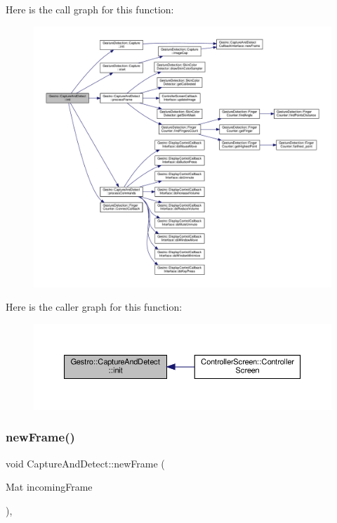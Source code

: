 Here is the call graph for this function\+:
\nopagebreak
\begin{figure}[H]
\begin{center}
\leavevmode
\includegraphics[width=350pt]{class_gestro_1_1_capture_and_detect_a1df110dc696cebc95eb5d7ead2d74447_cgraph}
\end{center}
\end{figure}
Here is the caller graph for this function\+:
\nopagebreak
\begin{figure}[H]
\begin{center}
\leavevmode
\includegraphics[width=350pt]{class_gestro_1_1_capture_and_detect_a1df110dc696cebc95eb5d7ead2d74447_icgraph}
\end{center}
\end{figure}
\mbox{\label{class_gestro_1_1_capture_and_detect_a7f18d1c58b2ae4241766b36aa27385e9}} 
\subsubsection{\texorpdfstring{new\+Frame()}{newFrame()}}
{\footnotesize\ttfamily void Capture\+And\+Detect\+::new\+Frame (\begin{DoxyParamCaption}\item[{Mat}]{incoming\+Frame }\end{DoxyParamCaption})\hspace{0.3cm}{\ttfamily [override]}, {\ttfamily [virtual]}}

